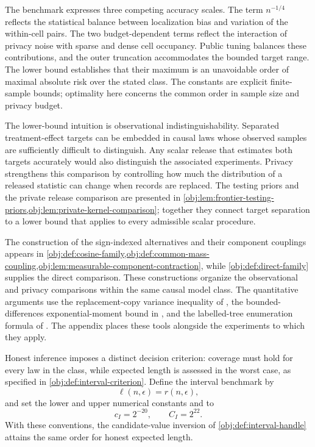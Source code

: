 \documentclass[11pt]{article}
\begin{document}
The benchmark expresses three competing accuracy scales. The term \(n^{-1/4}\) reflects the statistical balance between localization bias and variation of the within-cell pairs. The two budget-dependent terms reflect the interaction of privacy noise with sparse and dense cell occupancy. Public tuning balances these contributions, and the outer truncation accommodates the bounded target range. The lower bound establishes that their maximum is an unavoidable order of maximal absolute risk over the stated class. The constants are explicit finite-sample bounds; optimality here concerns the common order in sample size and privacy budget.

The lower-bound intuition is observational indistinguishability. Separated treatment-effect targets can be embedded in causal laws whose observed samples are sufficiently difficult to distinguish. Any scalar release that estimates both targets accurately would also distinguish the associated experiments. Privacy strengthens this comparison by controlling how much the distribution of a released statistic can change when records are replaced. The testing priors and the private release comparison are presented in \cref{obj:lem:frontier-testing-priors,obj:lem:private-kernel-comparison}; together they connect target separation to a lower bound that applies to every admissible scalar procedure.

The construction of the sign-indexed alternatives and their component couplings appears in \cref{obj:def:cosine-family,obj:def:common-mass-coupling,obj:lem:measurable-component-contraction}, while \cref{obj:def:direct-family} supplies the direct comparison. These constructions organize the observational and privacy comparisons within the same causal model class. The quantitative arguments use the replacement-copy variance inequality of \citet[Theorem 3.1, p.~54]{BoucheronLugosiMassart2013}, the bounded-differences exponential-moment bound in \citet[Theorem 6.2, displayed log-mgf conclusion in the proof, p.~167]{BoucheronLugosiMassart2013}, and the labelled-tree enumeration formula of \citet[Section 5.6, Theorem 5.40]{KellerTrotterAppliedCombinatorics}. The appendix places these tools alongside the experiments to which they apply.

Honest inference imposes a distinct decision criterion: coverage must hold for every law in the class, while expected length is assessed in the worst case, as specified in \cref{obj:def:interval-criterion}. Define the interval benchmark  by
\[
\ell(n,\epsilon)=r(n,\epsilon),
\]
and set the lower and upper numerical constants  and  to
\[
c_I=2^{-20},
\qquad
C_I=2^{22}.
\]
With these conventions, the candidate-value inversion of \cref{obj:def:interval-handle} attains the same order for honest expected length.
\end{document}
